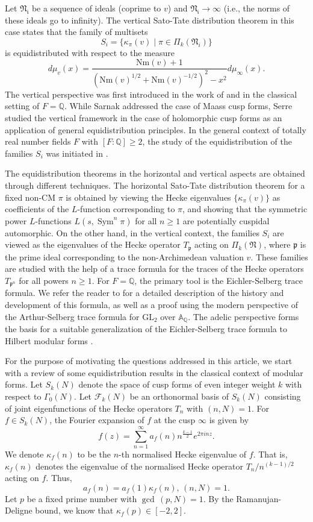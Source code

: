 \documentclass[reqno]{amsart}
\theoremstyle{plain}
\theoremstyle{definition}
\theoremstyle{remark}
\def\Q{\mathbb{Q}}
\def\GL{\mathrm{GL}}
\def\A{\mathbbm A}
\def\Q{\mathbb Q}
\def\A{\mathbb A}
\def\Sym{\operatorname{Sym}}
\begin{document}
Let $\mathfrak{N_i}$ be a sequence of ideals (coprime to $v$) and $\mathfrak{N_i} \to \infty$ (i.e., the norms of these ideals go to infinity). The vertical Sato-Tate distribution theorem in this case states that the family of multisets
$$
S_i = \{ \kappa_\pi (v) \mid \pi \in \Pi_k (\mathfrak{N}_i) \}
$$
is equidistributed with respect to the measure
$$
d \mu_v (x) = \frac{\mathrm{Nm}(v) + 1}{\left({\mathrm{Nm}(v)}^{1/2} + {\mathrm{Nm}(v)}^{-1/2}\right)^2 - x^2 } d \mu_\infty (x).
$$
The vertical perspective was first introduced in the work of \cite{Sarnak} and \cite{Serre} in the classical setting of $F = \Q$.  While Sarnak \cite{Sarnak} addressed the case of Maass cusp forms, Serre \cite{Serre} studied the vertical framework in the case of holomorphic cusp forms as an application of general equidistribution principles.  
In the general context of totally real number fields $F$ with $[F:\Q] \geq 2$, the study of the equidistribution of the families $S_i$ was initiated in \cite{Li-2009}.  

The  equidistribution theorems in the horizontal and vertical aspects are obtained through different techniques.  The horizontal Sato-Tate distribution theorem for a fixed non-CM $\pi$ is obtained by viewing the Hecke eigenvalues $\{\kappa_{\pi}(v)\}$ as coefficients of the $L$-function corresponding to $\pi$, and showing that the symmetric power $L$-functions $L(s, \Sym^n\pi)$ for all $n \geq 1$ are potentially cuspidal automorphic.  On the other hand, in the vertical context, the families $S_i$ are viewed as the eigenvalues of the Hecke operator $T_{\mathfrak p}$ acting on $\Pi_k (\mathfrak N)$, where $\mathfrak p$ is the prime ideal corresponding to the non-Archimedean valuation $v$.   These families are studied with the help of a trace formula for the traces of the Hecke operators $T_{\mathfrak p^n}$ for all powers $n \geq 1$.  For $F = \Q$, the primary tool is the Eichler-Selberg trace formula.  We refer the reader to \cite{KL-traces} for a detailed description of the history and development of this formula, as well as a proof using the modern perspective of the Arthur-Selberg trace formula for $\GL_2$ over $\A_{\Q}$.  The adelic perspective forms the basis for a suitable generalization of the Eichler-Selberg trace formula to Hilbert modular forms \cite{Li-2009}. 

For the purpose of motivating the questions addressed in this article, we start with a review of some equidistribution results in the classical context of modular forms.
Let $S_k(N)$ denote the space of cusp forms of even integer weight $k$ with respect to $\Gamma_0(N)$.  Let $\mathcal{F}_k(N)$ be an orthonormal basis of $S_k(N)$ consisting of joint eigenfunctions of the Hecke operators $T_n$ with $(n,N)=1$. For  $f\in S_k(N)$,
the Fourier expansion of $f$ at the cusp $\infty$ is given by $$f(z)=\sum_{n=1}^{\infty} a_f(n)n^{\frac{k-1}{2}}  e^{2\pi i nz}.$$  We denote $\kappa_f(n)$ to be the $n$-th normalised Hecke eigenvalue of $f$.  That is, $\kappa_f(n)$ denotes the eigenvalue of the normalised Hecke operator $T_n/n^{(k-1)/2}$ acting on $f$.  Thus,  
$$a_f(n)=a_f(1)\kappa_f(n),\,(n,N) = 1.$$
Let $p$ be a fixed prime number with $\gcd\,(p,N)=1.$  By the Ramanujan-Deligne bound, we know that $\kappa_f(p) \in [-2,2]$.  
\end{document}
